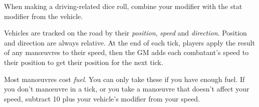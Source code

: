
When making a driving-related dice roll, combine your  modifier with the stat modifier from the vehicle.

Vehicles are tracked on the road by their \emph{position}, \emph{speed} and \emph{direction}. Position and direction are always relative. At the end of each tick, players apply the result of any man\oe{}uvres to their speed, then the GM adds each combatant's speed to their position to get their position for the next tick.

Most man\oe{}uvres cost \emph{fuel}. You can only take these if you have enough fuel. If you don't man\oe{}uvre in a tick, or you take a man\oe{}uvre that doesn't affect your speed, subtract 10 plus your vehicle's  modifier from your speed.
